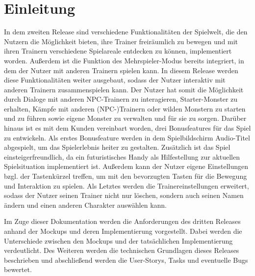 \setcounter{page}{1}

\chapter{Einleitung}\label{ch:einleitung}

In dem zweiten Release sind verschiedene Funktionalitäten der Spielwelt, die den Nutzern die Möglichkeit bieten, ihre Trainer freiräumlich zu bewegen und mit ihren Trainern verschiedene Spielareale entdecken zu können, implementiert worden. Außerdem ist die Funktion des Mehrspieler-Modus bereits integriert, in dem der Nutzer mit anderen Trainern spielen kann. In diesem Release werden diese Funktionalitäten weiter ausgebaut, sodass der Nutzer interaktiv mit anderen Trainern zusammenspielen kann. Der Nutzer hat somit die Möglichkeit durch Dialoge mit anderen \Gls{NPC}-Trainern zu interagieren, Starter-Monster zu erhalten, Kämpfe mit anderen (NPC-)Trainern oder wilden Monstern zu starten und zu führen sowie eigene Monster zu verwalten und für sie zu sorgen. Darüber hinaus ist es mit dem Kunden vereinbart worden, drei Bonusfeatures für das Spiel zu entwickeln. Als erstes Bonusfeature werden in dem Spielbildschirm Audio-Titel abgespielt, um das Spielerlebnis heiter zu gestalten.
Zusätzlich ist das Spiel einsteigerfreundlich, da ein futuristisches Handy als Hilfestellung zur aktuellen Spielsituation implementiert ist.
Außerdem kann der Nutzer eigene Einstellungen bzgl. der Tastenkürzel treffen, um mit den bevorzugten Tasten für die Bewegung und Interaktion zu spielen.
Als Letztes werden die Trainereinstellungen erweitert, sodass der Nutzer seinen Trainer nicht nur löschen, sondern auch seinen Namen ändern und einen anderen Charakter auswählen kann. 

Im Zuge dieser Dokumentation werden die Anforderungen des dritten Releases anhand der Mockups und deren Implementierung vorgestellt. Dabei werden die Unterschiede zwischen den Mockups und der tatsächlichen Implementierung verdeutlicht.
Des Weiteren werden die technischen Grundlagen dieses Releases beschrieben und abschließend werden die User-Storys, Tasks und eventuelle Bugs bewertet.